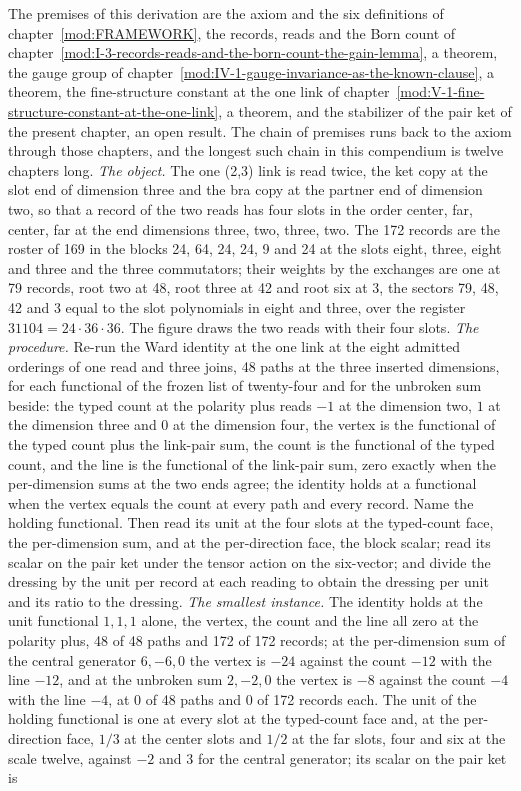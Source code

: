 \begin{chproof}
The premises of this derivation are the axiom and the six definitions of chapter~\ref{mod:FRAMEWORK}, the records, reads and the Born count of chapter~\ref{mod:I-3-records-reads-and-the-born-count-the-gain-lemma}, a theorem, the gauge group of chapter~\ref{mod:IV-1-gauge-invariance-as-the-known-clause}, a theorem, the fine-structure constant at the one link of chapter~\ref{mod:V-1-fine-structure-constant-at-the-one-link}, a theorem, and the stabilizer of the pair ket of the present chapter, an open result. The chain of premises runs back to the axiom through those chapters, and the longest such chain in this compendium is twelve chapters long.
\textit{The object.} The one (2,3) link is read twice, the ket copy at the slot end of dimension three and the bra copy at the partner end of dimension two, so that a record of the two reads has four slots in the order center, far, center, far at the end dimensions three, two, three, two. The 172 records are the roster of 169 in the blocks 24, 64, 24, 24, 9 and 24 at the slots eight, three, eight and three and the three commutators; their weights by the exchanges are one at 79 records, root two at 48, root three at 42 and root six at 3, the sectors 79, 48, 42 and 3 equal to the slot polynomials in eight and three, over the register $31104 = 24\cdot 36\cdot 36$. The figure draws the two reads with their four slots.
\textit{The procedure.} Re-run the Ward identity at the one link at the eight admitted orderings of one read and three joins, 48 paths at the three inserted dimensions, for each functional of the frozen list of twenty-four and for the unbroken sum beside: the typed count at the polarity plus reads $-1$ at the dimension two, $1$ at the dimension three and $0$ at the dimension four, the vertex is the functional of the typed count plus the link-pair sum, the count is the functional of the typed count, and the line is the functional of the link-pair sum, zero exactly when the per-dimension sums at the two ends agree; the identity holds at a functional when the vertex equals the count at every path and every record. Name the holding functional. Then read its unit at the four slots at the typed-count face, the per-dimension sum, and at the per-direction face, the block scalar; read its scalar on the pair ket under the tensor action on the six-vector; and divide the dressing by the unit per record at each reading to obtain the dressing per unit and its ratio to the dressing.
\textit{The smallest instance.} The identity holds at the unit functional $1,1,1$ alone, the vertex, the count and the line all zero at the polarity plus, 48 of 48 paths and 172 of 172 records; at the per-dimension sum of the central generator $6,-6,0$ the vertex is $-24$ against the count $-12$ with the line $-12$, and at the unbroken sum $2,-2,0$ the vertex is $-8$ against the count $-4$ with the line $-4$, at 0 of 48 paths and 0 of 172 records each. The unit of the holding functional is one at every slot at the typed-count face and, at the per-direction face, $1/3$ at the center slots and $1/2$ at the far slots, four and six at the scale twelve, against $-2$ and $3$ for the central generator; its scalar on the pair ket is

\end{chproof}
